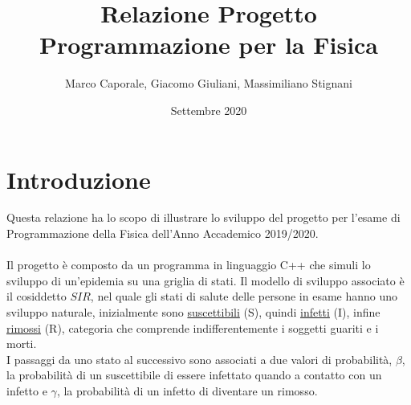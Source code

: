 \documentclass[a4paper]{article}
\begin{document}
\title{Relazione Progetto Programmazione per la Fisica}
\author{Marco Caporale, Giacomo Giuliani, Massimiliano Stignani}
\date{Settembre 2020}
\maketitle

\section{Introduzione}
Questa relazione ha lo scopo di illustrare lo sviluppo del progetto per l'esame di Programmazione della Fisica dell'Anno Accademico 2019/2020. \\ \\ Il progetto è composto da un programma in linguaggio C++ che simuli lo sviluppo di un'epidemia su una griglia di stati. Il modello di sviluppo associato è il cosiddetto $SIR$, nel quale gli stati di salute delle persone in esame hanno uno sviluppo naturale, inizialmente sono \underline{suscettibili} (S), quindi \underline{infetti} (I), infine \underline{rimossi} (R), categoria che comprende indifferentemente i soggetti guariti e i morti. \\ I passaggi da uno stato al successivo sono associati a due valori di probabilità, $\beta$, la probabilità di un suscettibile di essere infettato quando a contatto con un infetto e $\gamma$, la probabilità di un infetto di diventare un rimosso. \\ 
\end{document}
